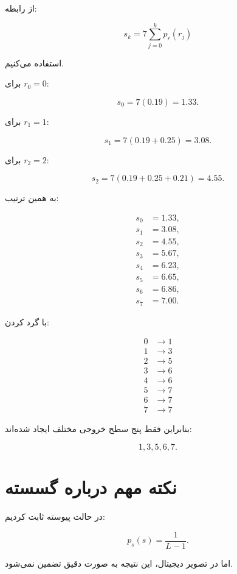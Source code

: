 \documentclass[12pt,a4paper]{article}
\begin{document}
	از رابطه:
	
	\[
	s_k
	=
	7
	\sum_{j=0}^{k}p_r(r_j)
	\]
	
	استفاده می‌کنیم.
	
	برای $r_0=0$:
	
	\[
	s_0=7(0.19)=1.33.
	\]
	
	برای $r_1=1$:
	
	\[
	s_1
	=
	7(0.19+0.25)
	=
	3.08.
	\]
	
	برای $r_2=2$:
	
	\[
	s_2
	=
	7(0.19+0.25+0.21)
	=
	4.55.
	\]
	
	به همین ترتیب:
	
	\[
	\begin{aligned}
		s_0&=1.33,\\
		s_1&=3.08,\\
		s_2&=4.55,\\
		s_3&=5.67,\\
		s_4&=6.23,\\
		s_5&=6.65,\\
		s_6&=6.86,\\
		s_7&=7.00.
	\end{aligned}
	\]
	
	با گرد کردن:
	
	\[
	\boxed{
		\begin{aligned}
			0&\rightarrow1\\
			1&\rightarrow3\\
			2&\rightarrow5\\
			3&\rightarrow6\\
			4&\rightarrow6\\
			5&\rightarrow7\\
			6&\rightarrow7\\
			7&\rightarrow7
		\end{aligned}
	}
	\tag{13}
	\]
	
	بنابراین فقط پنج سطح خروجی مختلف ایجاد شده‌اند:
	
	\[
	1,3,5,6,7.
	\]
	
	
	\section{نکته مهم درباره  گسسته}
	
	در حالت پیوسته ثابت کردیم:
	
	\[
	p_s(s)=\frac{1}{L-1}.
	\]
	
	اما در تصویر دیجیتال، این نتیجه به صورت دقیق تضمین نمی‌شود.
	
\end{document}
